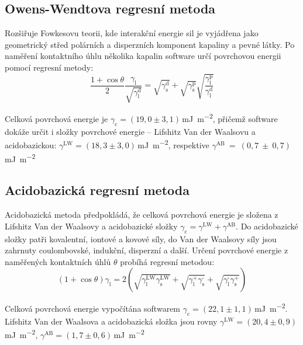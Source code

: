 \documentclass{protokol}
\begin{document}
\subsection{Owens-Wendtova regresní metoda}
Rozšiřuje Fowkesovu teorii, kde interakční energie sil je vyjádřena jako 
geometrický střed polárních a disperzních komponent kapaliny a pevné látky. Po 
naměření kontaktního úhlu několika kapalin software určí povrchovou energii 
pomocí regresní metody:
\begin{equation}
	\frac{1+\cos\theta}{2}\frac{\gamma_{\text{l}}}{\sqrt{\gamma_{\text{l}}^\text{d}}}
	 = \sqrt{\gamma_{\text{s}}^\text{d}} + \sqrt{\gamma_{\text{s}}^\text{p}} 
	 \sqrt{\frac{\gamma_{\text{l}}^\text{p}}{\gamma_{\text{l}}^\text{d}}}
\end{equation}
\par Celková povrchová energie je $\gamma_{\text{c}} = (19,0 \pm 
3,1)$\,\si{\milli\joule\per\meter\squared}, přičemž software dokáže určit i 
složky povrchové energie -- Lifshitz Van der Waalsovu a acidobazickou: 
$\gamma^\text{LW} = (18,3\pm3,0)$\,\si{\milli\joule\per\meter\squared}, respektive
$\gamma^\text{AB}~=~(0,7~\pm~0,7)$\,\si{\milli\joule\per\meter\squared}


\subsection{Acidobazická regresní metoda}
\par Acidobazická metoda předpokládá, že celková povrchová energie je složena z 
Lifshitz Van der Waalsovy a acidobazické složky $\gamma_{\text{c}} = 
\gamma^\text{LW} + \gamma^\text{AB}$. Do acidobazické složky patři kovalentní, 
iontové a kovové síly, do Van der Waalsovy síly jsou zahrnuty coulombovské, 
indukční, disperzní a další. Určení povrchové energie z naměřených kontaktních 
úhlů $\theta$ probíhá regresní metodou:
\begin{equation}
		\left(1+\cos\theta\right)\gamma_{\text{l}} = 
		2\left(\sqrt{\gamma_\text{l}^{\text{LW}}\gamma_\text{s}^{\text{LW}}} + 
		\sqrt{\gamma_\text{l}^{\text{+}}\gamma_\text{s}^{\text{-}}} + 
		\sqrt{\gamma_\text{l}^{\text{-}}\gamma_\text{s}^{\text{+}}}\right)
\end{equation}
\par Celková povrchová energie vypočítána softwarem $\gamma_{\text{c}} = (22,1 
\pm 
1,1)$\,\si{\milli\joule\per\meter\squared}. Lifshitz Van der Waalsova a 
acidobazická složka jsou rovny $\gamma^\text{LW} = 
(20,4\pm0,9)$\,\si{\milli\joule\per\meter\squared}, 
$\gamma^\text{AB} = (1,7\pm0,6)$\,\si{\milli\joule\per\meter\squared}
\end{document}
